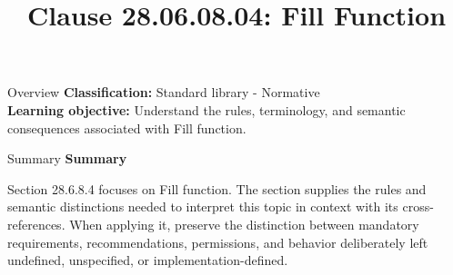 \documentclass[10pt,letterpaper]{article}
\title{Clause 28.06.08.04: Fill Function}
\author{}
\date{}
\begin{document}
\maketitle
\begin{CornellOverviewBox}{Overview}
\textbf{Classification:} Standard library - Normative\\[2pt]
\textbf{Learning objective:} Understand the rules, terminology, and semantic consequences associated with Fill function.
\end{CornellOverviewBox}\begin{CornellSummaryBox}{Summary}
{\sffamily\bfseries\color{Accent} Summary}\par\vspace{3pt}Section 28.6.8.4 focuses on Fill function. The section supplies the rules and semantic distinctions needed to interpret this topic in context with its cross-references. When applying it, preserve the distinction between mandatory requirements, recommendations, permissions, and behavior deliberately left undefined, unspecified, or implementation-defined.
\end{CornellSummaryBox}
\end{document}
